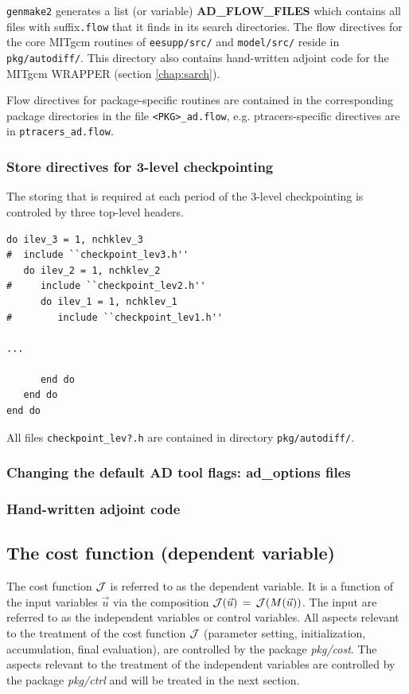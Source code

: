 {\tt genmake2} generates a list (or variable) {\bf AD\_FLOW\_FILES}
which contains all files with suffix{\tt .flow} that it finds 
in its search directories.
The flow directives for the core MITgcm routines of
{\tt eesupp/src/} and {\tt model/src/}
reside in {\tt pkg/autodiff/}.
This directory also contains hand-written adjoint code
for the MITgcm WRAPPER (section \ref{chap:sarch}).

Flow directives for package-specific routines are contained in
the corresponding package directories in the file
{\tt <PKG>\_ad.flow}, e.g. ptracers-specific directives are in
{\tt ptracers\_ad.flow}.

\subsubsection{Store directives for 3-level checkpointing}

The storing that is required at each period of the
3-level checkpointing is controled by three
top-level headers.

\begin{verbatim}
do ilev_3 = 1, nchklev_3
#  include ``checkpoint_lev3.h''
   do ilev_2 = 1, nchklev_2
#     include ``checkpoint_lev2.h''
      do ilev_1 = 1, nchklev_1
#        include ``checkpoint_lev1.h''

...

      end do
   end do
end do
\end{verbatim}

All files {\tt checkpoint\_lev?.h} are contained in directory
{\tt pkg/autodiff/}.


\subsubsection{Changing the default AD tool flags: ad\_options files}


\subsubsection{Hand-written adjoint code}


\subsection{The cost function (dependent variable)
\label{section_cost}}

The cost function $ {\cal J} $ is referred to as the {\sf dependent variable}.
It is a function of the input variables $ \vec{u} $ via the composition
$ {\cal J}(\vec{u}) \, = \, {\cal J}(M(\vec{u})) $. 
The input are referred to as the
{\sf independent variables} or {\sf control variables}.
All aspects relevant to the treatment of the cost function $ {\cal J} $
(parameter setting, initialization, accumulation, 
final evaluation), are controlled by the package {\it pkg/cost}.
The aspects relevant to the treatment of the independent variables
are controlled by the package {\it pkg/ctrl} and will be treated
in the next section.

